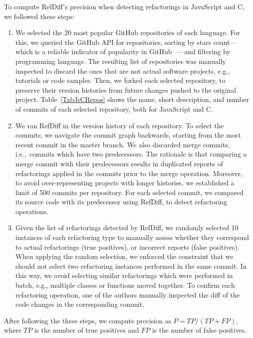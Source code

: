 To compute RefDiff's precision when detecting refactorings in JavaScript and C, we followed these steps:

\begin{enumerate}  
\item We selected the 20 most popular GitHub repositories of each language. For this, we queried the GitHub API for repositories, sorting by stars count---which is a reliable indicator of popularity in GitHub~\citep{icsme2016,jss-2018-github-stars} ---and filtering by programming language.
The resulting list of repositories was manually inspected to discard the ones that are not actual software projects, e.g., tutorials or code samples. Then, we forked each selected repository, to preserve their version histories from future changes pushed to the original project. Table~\ref{TabJsCRepos} shows the name, short description, and number of commits of each selected repository, both for JavaScript and C.

\item We ran RefDiff in the version history of each repository. To select the commits, we navigate the commit graph backwards, starting from the most recent commit in the master branch. We also discarded merge commits, i.e.,~commits which have two predecessors. The rationale is that comparing a merge commit with their predecessors results in duplicated reports of refactorings applied in the commits prior to the merge operation. Moreover, to avoid over-representing projects with longer histories, we established a limit of 500 commits per repository. For each selected commit, we compared its source code with its predecessor using RefDiff, to detect refactoring operations.

\item Given the list of refactorings detected by RefDiff, we randomly selected 10 instances of each refactoring type to manually assess whether they correspond to actual refactorings (true positives), or incorrect reports (false positives).
When applying the random selection, we enforced the constraint that we should not select two refactoring instances performed in the same commit.
In this way, we avoid selecting similar refactorings which were performed in batch, e.g., multiple classes or functions moved together.
To confirm each refactoring operation, one of the authors manually inspected the diff of the code changes in the corresponding commit.
\end{enumerate}

After following the three steps, we compute precision as $P = \mathit{TP} / (\mathit{TP} + \mathit{FP})$, where $\mathit{TP}$ is the number of true positives and $\mathit{FP}$ is the number of false positives.



